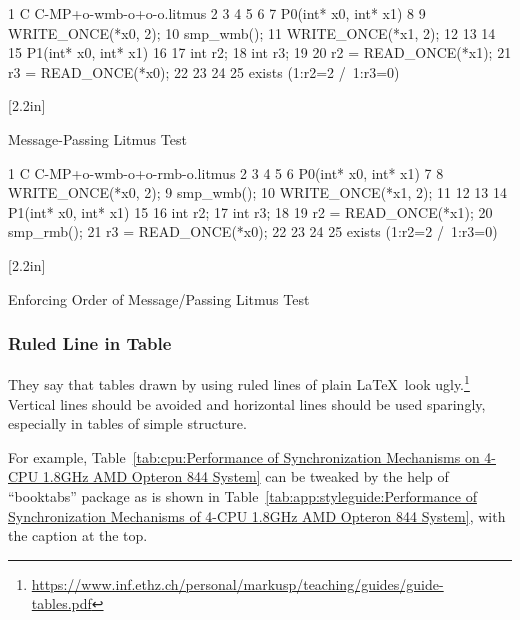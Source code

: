 \begin{listing*}\RawFloats
{ \scriptsize
\begin{verbbox}
 1 C C-MP+o-wmb-o+o-o.litmus
 2
 3 {
 4 }
 5
 6
 7 P0(int* x0, int* x1) {
 8
 9   WRITE_ONCE(*x0, 2);
10   smp_wmb();
11   WRITE_ONCE(*x1, 2);
12
13 }
14
15 P1(int* x0, int* x1) {
16
17   int r2;
18   int r3;
19
20   r2 = READ_ONCE(*x1);
21   r3 = READ_ONCE(*x0);
22
23 }
24
25 exists (1:r2=2 /\ 1:r3=0)
\end{verbbox}
}
  \begin{floatrow}[2]
    [2.2in]{\caption{Message-Passing Litmus Test}
      \label{lst:app:styleguide:Message-Passing Litmus Test}}{
      \theverbbox
}
{ \scriptsize
\begin{verbbox}
 1 C C-MP+o-wmb-o+o-rmb-o.litmus
 2
 3 {
 4 }
 5
 6 P0(int* x0, int* x1) {
 7
 8   WRITE_ONCE(*x0, 2);
 9   smp_wmb();
10   WRITE_ONCE(*x1, 2);
11
12 }
13
14 P1(int* x0, int* x1) {
15
16   int r2;
17   int r3;
18
19   r2 = READ_ONCE(*x1);
20   smp_rmb();
21   r3 = READ_ONCE(*x0);
22
23 }
24
25 exists (1:r2=2 /\ 1:r3=0)
\end{verbbox}
}
    \hspace{1em}%
    [2.2in]{\caption{Enforcing Order of Message\-/Passing Litmus Test}
      \label{lst:app:styleguide:Enforcing Order of Message-Passing Litmus Test}}{
      \theverbbox
}
  \end{floatrow}
\end{listing*}

\subsubsection{Ruled Line in Table}
\label{sec:app:styleguide:Ruled Line in Table}

They say that tables drawn by using ruled lines of plain \LaTeX\
look ugly.\footnote{
  \url{https://www.inf.ethz.ch/personal/markusp/teaching/guides/guide-tables.pdf}
}
Vertical lines should be avoided and horizontal lines should be
used sparingly, especially in tables of simple structure.

For example,
Table~\ref{tab:cpu:Performance of Synchronization Mechanisms on 4-CPU 1.8GHz AMD Opteron 844 System}
can be tweaked by the help of ``booktabs'' package as is shown in
Table~\ref{tab:app:styleguide:Performance of Synchronization Mechanisms of 4-CPU 1.8GHz AMD Opteron 844 System},
with the caption at the top.

